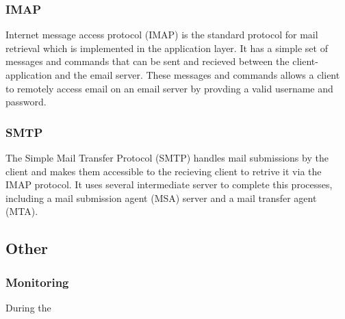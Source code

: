 \subsubsection{IMAP}
Internet message access protocol (IMAP) is the standard protocol for mail retrieval which is implemented in the application layer. It has a simple set of messages and commands that can be sent and recieved between the client-application and the email server. These messages and commands allows a client to remotely access email on an email server by provding a valid username and password.

\subsubsection{SMTP}
The Simple Mail Transfer Protocol (SMTP) handles mail submissions by the client and makes them accessible to the recieving client to retrive it via the IMAP protocol. It uses several intermediate server to complete this processes, including a mail submission agent (MSA) server and a mail transfer agent (MTA).

\subsection{Other}
\subsubsection{Monitoring}
During the 

